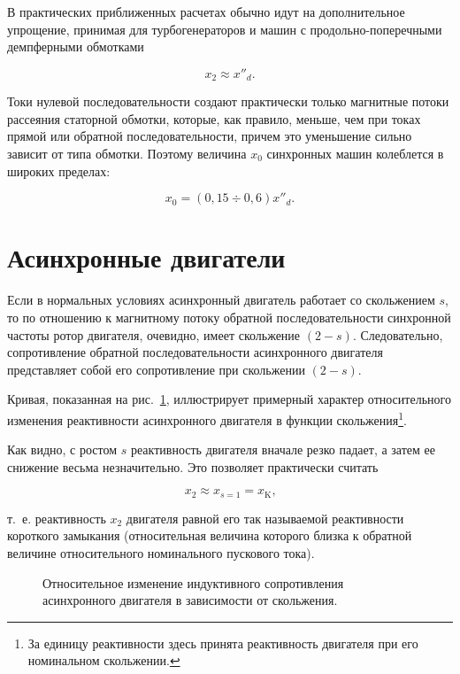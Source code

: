 В практических приближенных расчетах обычно идут на дополнительное упрощение, принимая для турбогенераторов и машин с продольно-поперечными демпферными обмотками

\begin{equation}
	x_2 \approx x''_d \text{.}
	\label{eq:12-4}
\end{equation}

Токи нулевой последовательности создают практически только магнитные потоки рассеяния статорной обмотки, которые, как правило, меньше, чем при токах прямой или обратной последовательности, причем это уменьшение сильно зависит от типа обмотки. Поэтому величина $ x_0 $ синхронных машин колеблется в широких пределах:

\begin{equation}
	x_0 = (0,15 \div 0,6) x''_d \text{.}
	\label{eq:12-5}
\end{equation}

\section{Асинхронные двигатели}
\label{sec:12-3}

Если в нормальных условиях асинхронный двигатель работает со скольжением $ s $, то по отношению к магнитному потоку обратной последовательности синхронной частоты ротор двигателя, очевидно, имеет скольжение $ (2-s) $. Следовательно, сопротивление обратной последовательности асинхронного двигателя представляет собой его сопротивление при скольжении $ (2-s) $.

Кривая, показанная на рис.~\ref{fig:12-2}, иллюстрирует примерный характер относительного изменения реактивности асинхронного двигателя в функции скольжения\footnote{За единицу реактивности здесь принята реактивность двигателя при его номинальном скольжении.}.

Как видно, с ростом $ s $ реактивность двигателя вначале резко падает, а затем ее снижение весьма незначительно. Это позволяет практически считать

\begin{equation}
	x_2 \approx x_{s=1} = x_{\text{K}} \text{,}
	\label{eq:12-6}
\end{equation}

т.~е. реактивность $ x_2 $ двигателя равной его так называемой реактивности короткого замыкания (относительная величина которого близка к обратной величине относительного номинального пускового тока).

\begin{figure} %
	\centering
	
	\caption{Относительное изменение индуктивного сопротивления асинхронного двигателя в зависимости от скольжения.}
	\label{fig:12-2}
\end{figure}

